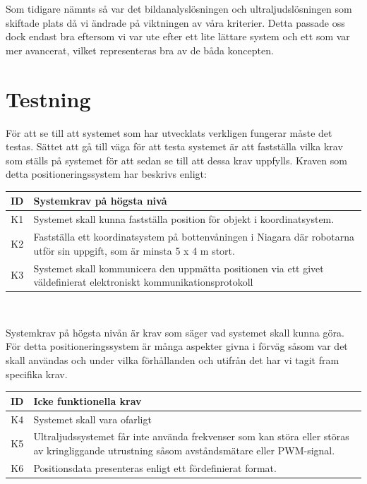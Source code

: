 \documentclass[11pt, a4paper]{report}
\begin{document}
Som tidigare nämnts så var det bildanalyslösningen och ultraljudslösningen som skiftade plats då vi ändrade på viktningen av våra kriterier. Detta passade oss dock endast bra eftersom vi var ute efter ett lite lättare system och ett som var mer avancerat, vilket representeras bra av de båda koncepten. 


\section{Testning}
För att se till att systemet som har utvecklats verkligen fungerar måste det testas. Sättet att gå till väga för att testa systemet är att fastställa vilka krav som ställs på systemet för att sedan se till att dessa krav uppfylls. Kraven som detta positioneringssystem har beskrivs enligt:

\begin{center}
	\begin{tabular}{c | p{13.5cm}}
	ID & Systemkrav på högsta nivå \\ \hline
	K1 & Systemet skall kunna fastställa position för objekt i koordinatsystem. \\
	K2 & Fastställa ett koordinatsystem på bottenvåningen i Niagara där robotarna utför sin uppgift, som är minsta 5 x 4 m stort. \\
	K3 & Systemet skall kommunicera den uppmätta positionen via ett givet väldefinierat elektroniskt kommunikationsprotokoll \\
	\end{tabular}
	\\ [0.5cm]
\end{center}

	Systemkrav på högsta nivån är krav som säger vad systemet skall kunna göra. För detta positioneringssystem är många aspekter givna i förväg såsom var det skall användas och under vilka förhållanden och utifrån det har vi tagit fram specifika krav.
	
\begin{center}
	\begin{tabular}{c | p{13.5cm}}
	ID & Icke funktionella krav \\ \hline
	K4 & Systemet skall vara ofarligt \\
	K5 & Ultraljudssystemet får inte använda frekvenser som kan störa eller störas av kringliggande utrustning såsom avståndsmätare eller PWM-signal. \\
	K6 & Positionsdata presenteras enligt ett fördefinierat format. \\
	\end{tabular}
	\\ [0.5cm]
\end{center}
\end{document}
